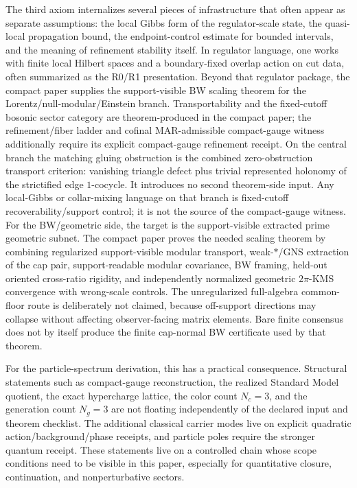 \documentclass[11pt]{article}
\begin{document}
The third axiom internalizes several pieces of infrastructure that often appear as separate
assumptions: the local Gibbs form of the regulator-scale state, the
quasi-local propagation bound, the endpoint-control estimate for bounded intervals, and the
meaning of refinement stability itself. In regulator language, one works with finite local
Hilbert spaces and a boundary-fixed overlap action on cut data, often summarized as the R0/R1
presentation. Beyond that regulator package, the compact paper supplies the support-visible BW
scaling theorem for the Lorentz/null-modular/Einstein branch. Transportability and the fixed-cutoff bosonic sector category are theorem-produced in the compact paper; the refinement/fiber
ladder and cofinal MAR-admissible compact-gauge witness additionally require its explicit compact-gauge refinement receipt. On the central branch the matching gluing
obstruction is the combined zero-obstruction transport criterion: vanishing triangle defect plus
trivial represented holonomy of the strictified edge \(1\)-cocycle. It introduces no second theorem-side input. Any
local-Gibbs or collar-mixing language on that branch is fixed-cutoff recoverability/support
control; it is not the source of the compact-gauge witness.
For the BW/geometric side, the target is the support-visible extracted prime geometric subnet.
The compact paper proves the needed scaling theorem by combining regularized support-visible
modular transport, weak-\(*\)/GNS extraction of the cap pair, support-readable modular covariance,
BW framing, held-out oriented cross-ratio rigidity, and independently normalized geometric
\(2\pi\)-KMS convergence with wrong-scale controls. The unregularized full-algebra common-floor
route is deliberately not claimed, because off-support directions may collapse without affecting
observer-facing matrix elements. Bare finite consensus does not by itself produce the finite
cap-normal BW certificate used by that theorem.

For the particle-spectrum derivation, this has a practical consequence. Structural statements such
as compact-gauge reconstruction, the realized Standard Model quotient, the exact hypercharge
lattice, the color count \(N_c=3\), and the generation count \(N_g=3\) are not floating
independently of the declared input and theorem checklist. The additional classical carrier modes
live on explicit quadratic action/background/phase receipts, and particle poles require the
stronger quantum receipt. These statements live on a
controlled chain whose scope conditions need to be visible in this paper,
especially for quantitative closure, continuation, and
nonperturbative sectors.
\end{document}
